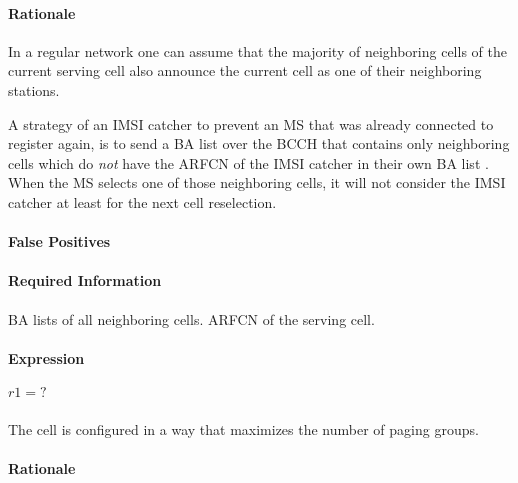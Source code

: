 \documentclass[a4paper,11pt,notitlepage,bigheadings,oneside]{scrartcl}
\begin{document}
\paragraph{Rationale}

In a regular network one can assume that the majority of neighboring cells of
the current serving cell also announce the current cell as one of their
neighboring stations. 

A strategy of an IMSI catcher to prevent an MS that was already connected to
register again, is to send a BA list over the BCCH that contains only
neighboring cells which do \emph{not} have the ARFCN of the IMSI catcher in
their own BA list \cite[0027]{bott2000verfahren}. When the MS selects one of
those neighboring cells, it will not consider the IMSI catcher at least for the
next cell reselection.

\paragraph{False Positives}


\paragraph{Required Information}

BA lists of all neighboring cells. ARFCN of the serving cell.


\paragraph{Expression}

$r1 = ?$

\subsubsection{}

The cell is configured in a way that maximizes the number of paging groups.

\paragraph{Rationale}
\end{document}
